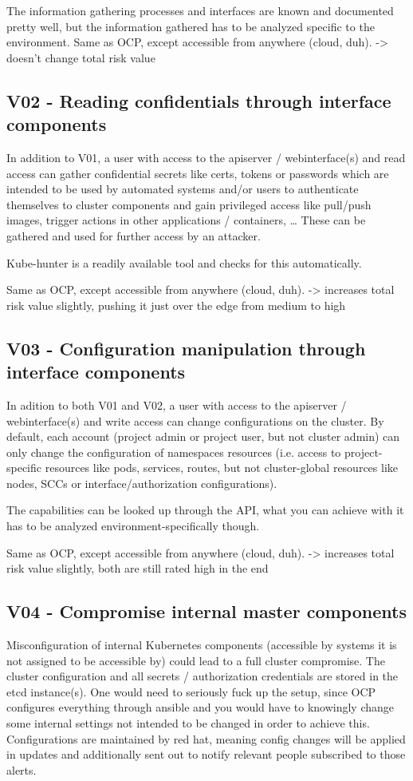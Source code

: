 The information gathering processes and interfaces are known and documented pretty well, but the information gathered has to be analyzed specific to the environment.
Same as OCP, except accessible from anywhere (cloud, duh).
-> doesn’t change total risk value

\subsection{V02 - Reading confidentials through interface components}
In addition to V01, a user with access to the apiserver / webinterface(s) and read access can gather confidential secrets like certs, tokens or passwords which are intended to be used by automated systems and/or users to authenticate themselves to cluster components and gain privileged access like pull/push images, trigger actions in other applications / containers, …
These can be gathered and used for further access by an attacker.

Kube-hunter is a readily available tool and checks for this automatically.

Same as OCP, except accessible from anywhere (cloud, duh).
-> increases total risk value slightly, pushing it just over the edge from medium to high

\subsection{V03 - Configuration manipulation through interface components}
In adition to both V01 and V02, a user with access to the apiserver / webinterface(s) and write access can change configurations on the cluster. By default, each account (project admin or project user, but not cluster admin) can only change the configuration of namespaces resources (i.e. access to project-specific resources like pods, services, routes, but not cluster-global resources like nodes, SCCs or interface/authorization configurations). 

The capabilities can be looked up through the API, what you can achieve with it has to be analyzed environment-specifically though.

Same as OCP, except accessible from anywhere (cloud, duh).
-> increases total risk value slightly, both are still rated high in the end


\subsection{V04 - Compromise internal master components}
Misconfiguration of internal Kubernetes components (accessible by systems it is not assigned to be accessible by) could lead to a full cluster compromise. The cluster configuration and all secrets / authorization credentials are stored in the etcd instance(s). One would need to seriously fuck up the setup, since OCP configures everything through ansible and you would have to knowingly change some internal settings not intended to be changed in order to achieve this. Configurations are maintained by red hat, meaning config changes will be applied in updates and additionally sent out to notify relevant people subscribed to those alerts.

